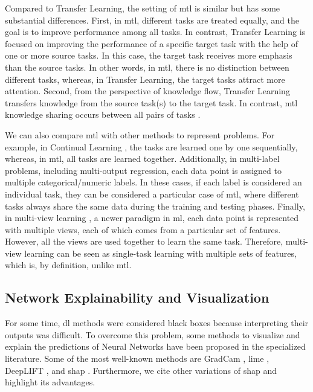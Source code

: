 Compared to Transfer Learning, the setting of \acs{mtl} is similar but has some substantial differences. First, in \acs{mtl}, different tasks are treated equally, and the goal is to improve performance among all tasks. In contrast, Transfer Learning is focused on improving the performance of a specific target task with the help of one or more source tasks. In this case, the target task receives more emphasis than the source tasks. In other words, in \acs{mtl}, there is no distinction between different tasks, whereas, in Transfer Learning, the target tasks attract more attention. Second, from the perspective of knowledge flow, Transfer Learning transfers knowledge from the source task(s) to the target task. In contrast, \acl{mtl} knowledge sharing occurs between all pairs of tasks \citep{zhang2017survey}.

We can also compare \acs{mtl} with other methods to represent problems. For example, in Continual Learning \citep{chen2018lifelong}, the tasks are learned one by one sequentially, whereas, in \acs{mtl}, all tasks are learned together. Additionally, in multi-label problems, including multi-output regression, each data point is assigned to multiple categorical/numeric labels. In these cases, if each label is considered an individual task, they can be considered a particular case of \acl{mtl}, where different tasks always share the same data during the training and testing phases. Finally, in multi-view learning \citep{ZHAO201743}, a newer paradigm in \acl{ml}, each data point is represented with multiple views, each of which comes from a particular set of features. However, all the views are used together to learn the same task. Therefore, multi-view learning can be seen as single-task learning with multiple sets of features, which is, by definition, unlike \acs{mtl}.

\subsection{Network Explainability and Visualization}

For some time, \acl{dl} methods were considered black boxes because interpreting their outputs was difficult. To overcome this problem, some methods to visualize and explain the predictions of Neural Networks have been proposed in the specialized literature. Some of the most well-known methods are GradCam \citep{gradcam}, \acf{lime} \citep{lime}, DeepLIFT \citep{deeplift_old, deeplift_new}, and \acs{shap} \citep{shap2018}. 
 Furthermore, we cite other variations of \acs{shap} and highlight its advantages.

